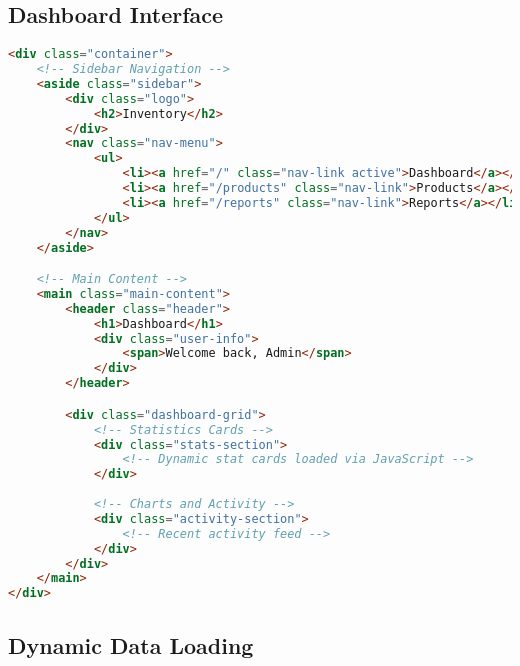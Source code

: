 \documentclass[12pt,a4paper]{article}
\begin{document}
\subsection{Dashboard Interface}

\begin{lstlisting}[language=HTML, caption=Dashboard Layout Structure]
<div class="container">
    <!-- Sidebar Navigation -->
    <aside class="sidebar">
        <div class="logo">
            <h2>Inventory</h2>
        </div>
        <nav class="nav-menu">
            <ul>
                <li><a href="/" class="nav-link active">Dashboard</a></li>
                <li><a href="/products" class="nav-link">Products</a></li>
                <li><a href="/reports" class="nav-link">Reports</a></li>
            </ul>
        </nav>
    </aside>

    <!-- Main Content -->
    <main class="main-content">
        <header class="header">
            <h1>Dashboard</h1>
            <div class="user-info">
                <span>Welcome back, Admin</span>
            </div>
        </header>

        <div class="dashboard-grid">
            <!-- Statistics Cards -->
            <div class="stats-section">
                <!-- Dynamic stat cards loaded via JavaScript -->
            </div>
            
            <!-- Charts and Activity -->
            <div class="activity-section">
                <!-- Recent activity feed -->
            </div>
        </div>
    </main>
</div>
\end{lstlisting}

\subsection{Dynamic Data Loading}
\end{document}
